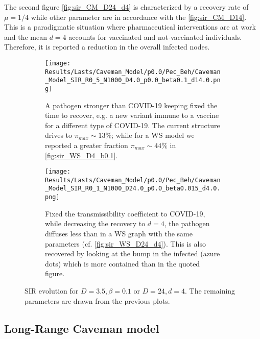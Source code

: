 \documentclass[a4paper,10pt, oneside]{book} %
\theoremstyle{definition}
\begin{document}
The second figure \autoref{fig:sir_CM_D24_d4} is characterized by a recovery rate of $ \mu = 1/4$ while other parameter are in accordance with the \autoref{fig:sir_CM_D14}. This is a paradigmatic situation where pharmaceutical interventions are at work and the mean $ d = 4$ accounts for vaccinated and not-vaccinated individuals. Therefore, it is reported a reduction in the overall infected nodes.
\par\medskip
\begin{figure}[htbp]
	\centering
	\begin{subfigure}{0.9\linewidth}
		\texttt{[image: Results/Lasts/Caveman\_Model/p0.0/Pec\_Beh/Caveman\_Model\_SIR\_R0\_5\_N1000\_D4.0\_p0.0\_beta0.1\_d14.0.png]}
		\caption{A pathogen stronger than COVID-19 keeping fixed the time to recover, e.g. a new variant immune to a vaccine for a different type of COVID-19. The current structure drives to $ \pi_{max} \sim 13\%$; while for a WS model we reported a greater fraction $ \pi_{max} \sim 44\%$ in \autoref{fig:sir_WS_D4_b0.1}.}
		\label{fig:sir_CM_D4_d14_b0.1}
	\end{subfigure}
	\par\bigskip
	\centering
	\begin{subfigure}{0.9\linewidth}
		\texttt{[image: Results/Lasts/Caveman\_Model/p0.0/Pec\_Beh/Caveman\_Model\_SIR\_R0\_1\_N1000\_D24.0\_p0.0\_beta0.015\_d4.0.png]}
		\caption{Fixed the transmissibility coefficient to COVID-19, while decreasing the recovery to $d = 4$, the pathogen diffuses less than in a WS graph with the same parameters (cf. \autoref{fig:sir_WS_D24_d4}). This is also recovered by looking at the bump in the infected (azure dots) which is more contained than in the quoted figure.}
		\label{fig:sir_CM_D24_d4}
	\end{subfigure}
	\caption{SIR evolution for $D = 3.5, \beta = 0.1$ or $ D=24,d=4$. The remaining parameters are drawn from the previous plots.}
	\label{fig:sir_CMD4b0.1_D14d4}
\end{figure}

\clearpage
\subsection{Long-Range Caveman model}
\label{sec:res_LRCM}
\end{document}
